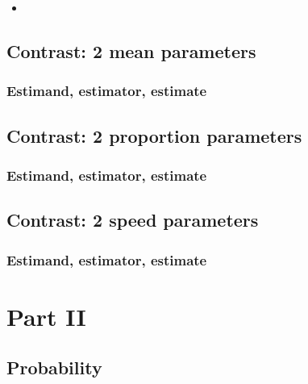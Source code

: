 \documentclass[]{book}
\begin{document}
\begin{itemize}
\item
\end{itemize}

\hypertarget{contrast2Muparas}{%
\chapter{Contrast: 2 mean parameters}\label{contrast2Muparas}}

\hypertarget{estimand-estimator-estimate}{%
\section{Estimand, estimator, estimate}\label{estimand-estimator-estimate}}

\hypertarget{contrast2Piparas}{%
\chapter{Contrast: 2 proportion parameters}\label{contrast2Piparas}}

\hypertarget{estimand-estimator-estimate-1}{%
\section{Estimand, estimator, estimate}\label{estimand-estimator-estimate-1}}

\hypertarget{contrast2Lambdaparas}{%
\chapter{Contrast: 2 speed parameters}\label{contrast2Lambdaparas}}

\hypertarget{estimand-estimator-estimate-2}{%
\section{Estimand, estimator, estimate}\label{estimand-estimator-estimate-2}}

\hypertarget{part-part-ii}{%
\part{Part II}\label{part-part-ii}}

\hypertarget{Probability}{%
\chapter{Probability}\label{Probability}}
\end{document}

